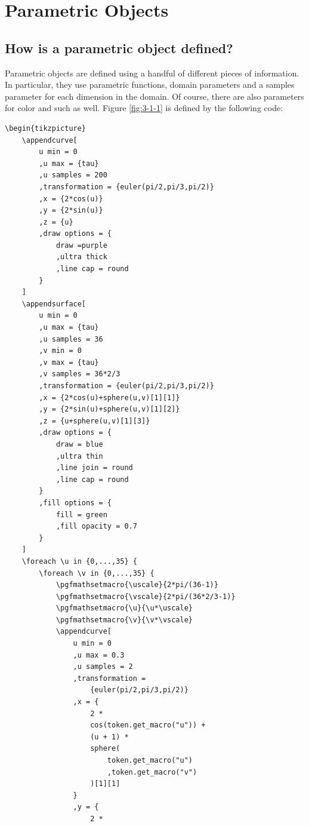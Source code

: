 \documentclass[12pt]{report}
\begin{document}
    \chapter{Parametric Objects}
        \section{How is a parametric object defined?}
            Parametric objects are defined using a handful of 
            different pieces of information. In particular, they 
            use parametric functions, domain parameters and a samples
            parameter for each dimension in the domain. Of course, 
            there are also parameters for color and such as well. 
            Figure \ref{fig:3-1-1} is defined by the following code:
\begin{verbatim}
\begin{tikzpicture}
    \appendcurve[
        u min = 0
        ,u max = {tau}
        ,u samples = 200
        ,transformation = {euler(pi/2,pi/3,pi/2)}
        ,x = {2*cos(u)}
        ,y = {2*sin(u)}
        ,z = {u}
        ,draw options = {
            draw =purple
            ,ultra thick
            ,line cap = round
        }
    ]
    \appendsurface[
        u min = 0
        ,u max = {tau}
        ,u samples = 36
        ,v min = 0
        ,v max = {tau}
        ,v samples = 36*2/3
        ,transformation = {euler(pi/2,pi/3,pi/2)}
        ,x = {2*cos(u)+sphere(u,v)[1][1]}
        ,y = {2*sin(u)+sphere(u,v)[1][2]}
        ,z = {u+sphere(u,v)[1][3]}
        ,draw options = {
            draw = blue
            ,ultra thin
            ,line join = round
            ,line cap = round
        }
        ,fill options = {
            fill = green
            ,fill opacity = 0.7
        }
    ]
    \foreach \u in {0,...,35} {
        \foreach \v in {0,...,35} {
            \pgfmathsetmacro{\uscale}{2*pi/(36-1)}
            \pgfmathsetmacro{\vscale}{2*pi/(36*2/3-1)}
            \pgfmathsetmacro{\u}{\u*\uscale}
            \pgfmathsetmacro{\v}{\v*\vscale}
            \appendcurve[
                u min = 0
                ,u max = 0.3
                ,u samples = 2
                ,transformation = 
                    {euler(pi/2,pi/3,pi/2)}
                ,x = {
                    2 * 
                    cos(token.get_macro("u")) +
                    (u + 1) * 
                    sphere(
                        token.get_macro("u")
                        ,token.get_macro("v")
                    )[1][1]
                }
                ,y = {
                    2 * 

\end{verbatim}
\end{document}
